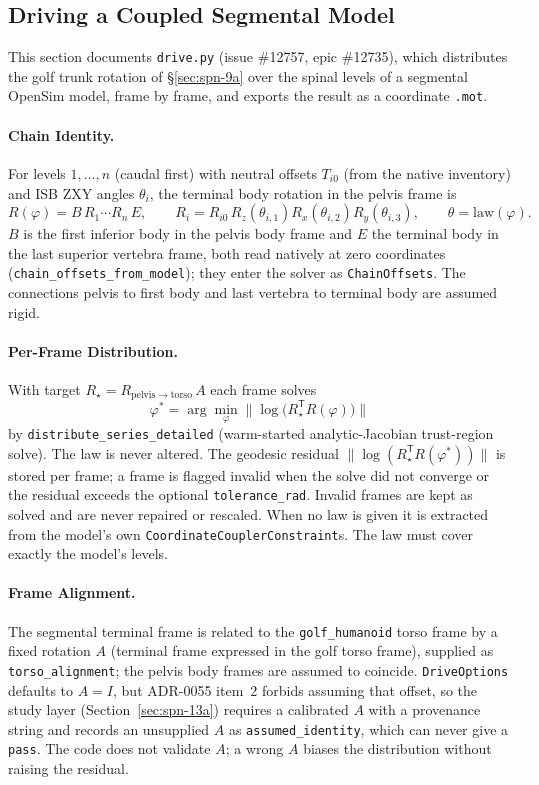 \subsection{Driving a Coupled Segmental Model}
\label{sec:spn-9b}

This section documents \texttt{drive.py} (issue \#12757, epic \#12735), which
distributes the golf trunk rotation of \S\ref{sec:spn-9a} over the spinal
levels of a segmental OpenSim model, frame by frame, and exports the result as
a coordinate \texttt{.mot}.

\paragraph{Chain Identity.}
For levels $1,\dots,n$ (caudal first) with neutral offsets $T_{i0}$ (from the
native inventory) and ISB ZXY angles $\theta_i$, the terminal body rotation in
the pelvis frame is
\[
  R(\varphi) = B\,R_1\cdots R_n\,E,\qquad
  R_i = R_{i0}\,R_z(\theta_{i,1})R_x(\theta_{i,2})R_y(\theta_{i,3}),\qquad
  \theta = \mathrm{law}(\varphi).
\]
$B$ is the first inferior body in the pelvis body frame and $E$ the terminal
body in the last superior vertebra frame, both read natively at zero
coordinates (\texttt{chain\_offsets\_from\_model}); they enter the solver as
\texttt{ChainOffsets}. The connections pelvis to first body and last vertebra
to terminal body are assumed rigid.

\paragraph{Per-Frame Distribution.}
With target $R_\star = R_{\mathrm{pelvis}\to\mathrm{torso}}\,A$ each frame solves
\[
  \varphi^\ast = \arg\min_\varphi \bigl\| \log\!\bigl(R_\star^{\mathsf T}
  R(\varphi)\bigr) \bigr\|
\]
by \texttt{distribute\_series\_detailed} (warm-started analytic-Jacobian
trust-region solve). The law is never altered. The geodesic residual
$\|\log(R_\star^{\mathsf T}R(\varphi^\ast))\|$ is stored per frame; a frame is
flagged invalid when the solve did not converge or the residual exceeds the
optional \texttt{tolerance\_rad}. Invalid frames are kept as solved and are
never repaired or rescaled. When no law is given it is extracted from the
model's own \texttt{CoordinateCouplerConstraint}s. The law must cover exactly
the model's levels.

\paragraph{Frame Alignment.}
The segmental terminal frame is related to the \texttt{golf\_humanoid} torso
frame by a fixed rotation $A$ (terminal frame expressed in the golf torso
frame), supplied as \texttt{torso\_alignment}; the pelvis body frames are
assumed to coincide. \texttt{DriveOptions} defaults to $A=I$, but ADR-0055
item~2 forbids assuming that offset, so the study layer
(Section~\ref{sec:spn-13a}) requires a calibrated $A$ with a provenance string
and records an unsupplied $A$ as \texttt{assumed\_identity}, which can never
give a \texttt{pass}. The code does not validate $A$; a wrong $A$ biases the
distribution without raising the residual.

